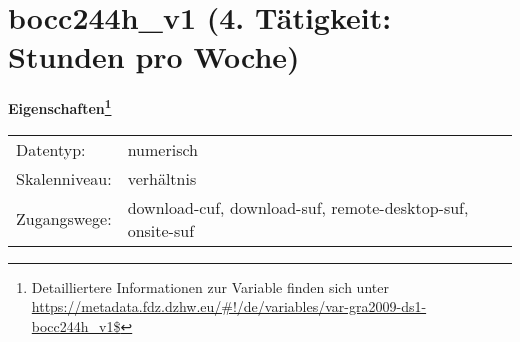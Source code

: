 
    \setcounter{footnote}{0}

    \vspace*{-1.8cm}
	\section{bocc244h\_v1 (4. Tätigkeit: Stunden pro Woche)}
	\label{section:bocc244h_v1}



    \vspace*{0.5cm}
    \noindent\textbf{Eigenschaften\footnote{Detailliertere Informationen zur Variable finden sich unter
		\url{https://metadata.fdz.dzhw.eu/\#!/de/variables/var-gra2009-ds1-bocc244h_v1$}}}\\
	\begin{tabularx}{\hsize}{@{}lX}
	Datentyp: & numerisch \\
	Skalenniveau: & verhältnis \\
	Zugangswege: &
	  download-cuf, 
	  download-suf, 
	  remote-desktop-suf, 
	  onsite-suf
 \\
    \end{tabularx}




